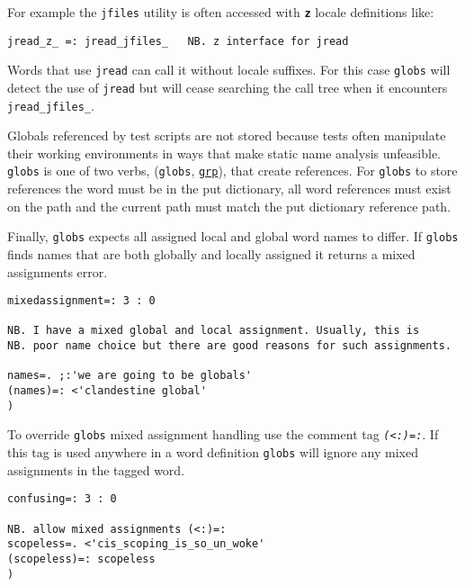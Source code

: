 For example the \texttt{jfiles} utility is often 
accessed with \textbf{\texttt{z}} locale definitions like: 

\begin{lstlisting}[frame=single,framerule=0pt] 
   jread_z_ =: jread_jfiles_   NB. z interface for jread
\end{lstlisting}

Words that use \texttt{jread} can call it without locale suffixes. 
For this case \texttt{globs} will detect the use of \texttt{jread} but will 
cease searching the call tree when it encounters \verb|jread_jfiles_|.

Globals referenced by test scripts are not stored because tests 
often manipulate their working environments in ways that make 
static name analysis unfeasible. \texttt{globs} is one of two verbs, 
(\texttt{globs}, \hyperlink{il:grp}{\texttt{grp}}), that create references. 
For \texttt{globs} to store 
references the word must be in the put dictionary, all 
word references must exist on the path and the current 
path must match the put dictionary reference path. 

Finally, \texttt{globs} expects all assigned local and global word names to differ. If \texttt{globs}
finds names that are both globally and locally assigned it returns a mixed assignments error.

\begin{lstlisting}[frame=single,framerule=0pt]
mixedassignment=: 3 : 0

NB. I have a mixed global and local assignment. Usually, this is 
NB. poor name choice but there are good reasons for such assignments.

names=. ;:'we are going to be globals'
(names)=: <'clandestine global'
)
\end{lstlisting}

\noindent To override \texttt{globs} mixed assignment handling use the comment tag
 \textcolor{CodeComment}{\texttt{\textsl{(<:)=:}}}.
If this tag is used anywhere in a word definition \texttt{globs} will ignore any 
mixed assignments in the tagged word.

\begin{lstlisting}[frame=single,framerule=0pt]
confusing=: 3 : 0

NB. allow mixed assignments (<:)=:
scopeless=. <'cis_scoping_is_so_un_woke'
(scopeless)=: scopeless 
)
\end{lstlisting}



